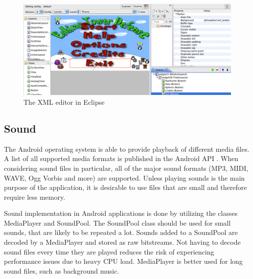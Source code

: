 \begin{figure}[here]
\begin{center}
\includegraphics[scale=0.3]{pics/chapters/chapter2/xmleditor}
\end{center}

\caption{The XML editor in Eclipse}
\label{fig:xmlEditor}

\end{figure}

\subsection{Sound}

The Android operating system is able to provide playback of different media files. A list of all supported media formats is published in the Android API \citep{Android}. When considering sound files in particular, all of the major sound formats (MP3, MIDI, WAVE, Ogg Vorbis and more) are supported. Unless playing sounds is the main purpose of the application, it is desirable to use files that are small and therefore require less memory. 

Sound implementation in Android applications is done by utilizing the classes MediaPlayer and SoundPool. The SoundPool class should be used for small sounds, that are likely to be repeated a lot. Sounds added to a SoundPool are decoded by a MediaPlayer and stored as raw bitstreams. Not having to decode sound files every time they are played reduces the risk of experiencing performance issues due to heavy CPU load. MediaPlayer is better used for long sound files, such as background music. \citep{Android}
